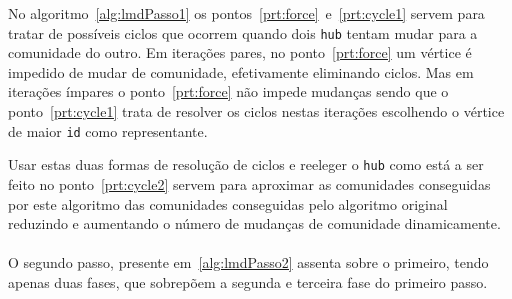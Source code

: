 No algoritmo~\ref{alg:lmdPasso1} os pontos~\ref{prt:force}~e~\ref{prt:cycle1} servem para tratar de possíveis ciclos que ocorrem quando dois \verb|hub| tentam mudar para a comunidade do outro.
Em iterações pares, no ponto~\ref{prt:force} um vértice é impedido de mudar de comunidade, efetivamente eliminando ciclos.
Mas em iterações ímpares o ponto~\ref{prt:force} não impede mudanças sendo que o ponto~\ref{prt:cycle1} trata de resolver os ciclos nestas iterações escolhendo o vértice de maior \verb|id| como representante.

Usar estas duas formas de resolução de ciclos e reeleger o \verb|hub| como está a ser feito no ponto~\ref{prt:cycle2} servem para aproximar as comunidades conseguidas por este algoritmo das comunidades conseguidas pelo algoritmo original reduzindo e aumentando o número de mudanças de comunidade dinamicamente.

\paragraph{}
O segundo passo, presente em~\ref{alg:lmdPasso2} assenta sobre o primeiro, tendo apenas duas fases, que sobrepõem a segunda e terceira fase do primeiro passo.

